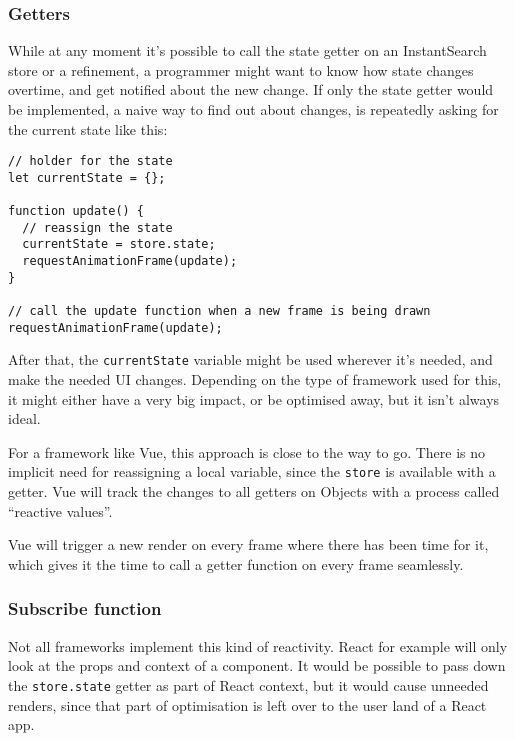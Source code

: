 \subsubsection{Getters}
\label{ssub:getters}

While at any moment it's possible to call the state getter on an InstantSearch store or a refinement, a programmer might want to know how state changes overtime, and get notified about the new change. If only the state getter would be implemented, a naive way to find out about changes, is repeatedly asking for the current state like this:

\begin{minipage}{\linewidth}
\begin{lstlisting}[caption={Naive way to find out about changed state},label={lst:is-core-naive-subscribe}]
// holder for the state
let currentState = {};

function update() {
  // reassign the state
  currentState = store.state;
  requestAnimationFrame(update);
}

// call the update function when a new frame is being drawn
requestAnimationFrame(update);
\end{lstlisting}
\end{minipage}

After that, the {\tt currentState} variable might be used wherever it's needed, and make the needed UI changes. Depending on the type of framework used for this, it might either have a very big impact, or be optimised away, but it isn't always ideal.

For a framework like Vue\cite{vue-reactivity}, this approach is close to the way to go. There is no implicit need for reassigning a local variable, since the {\tt store} is available with a getter. Vue will track the changes to all getters on Objects with a process called ``reactive values''.

Vue will trigger a new render on every frame where there has been time for it, which gives it the time to call a getter function on every frame seamlessly. 

\subsubsection{Subscribe function}
\label{ssub:subscribe_function}

Not all frameworks implement this kind of reactivity. React for example will only look at the \gls{props} and context of a component. It would be possible to pass down the {\tt store.state} getter as part of React context, but it would cause unneeded renders, since that part of optimisation is left over to the user land of a React app. 

